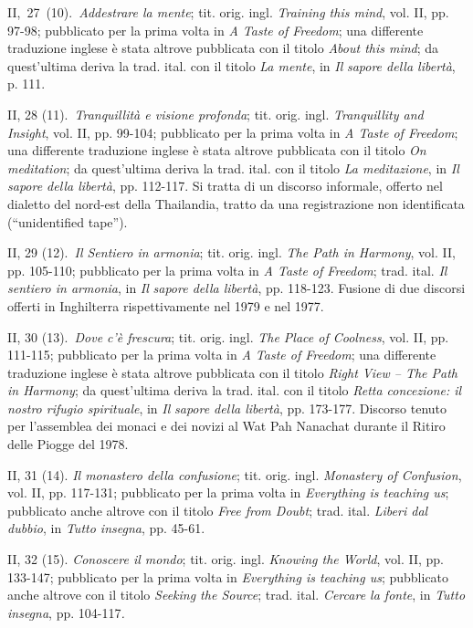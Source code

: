 II,~27~(10).~\emph{Addestrare la mente}; tit. orig. ingl. \emph{Training
this mind}, vol. II, pp. 97-98; pubblicato per la prima volta in \emph{A
Taste of Freedom}; una differente traduzione inglese è stata altrove
pubblicata con il titolo \emph{About this mind}; da quest'ultima deriva
la trad. ital. con il titolo \emph{La mente}, in \emph{Il} \emph{sapore
della libertà}, p. 111.

II, 28 (11).~\emph{Tranquillità e visione profonda}; tit. orig. ingl.
\emph{Tranquillity and Insight}, vol. II, pp. 99-104; pubblicato per la
prima volta in \emph{A Taste of Freedom}; una differente traduzione
inglese è stata altrove pubblicata con il titolo \emph{On meditation};
da quest'ultima deriva la trad. ital. con il titolo \emph{La
meditazione}, in \emph{Il} \emph{sapore della libertà}, pp. 112-117. Si
tratta di un discorso informale, offerto nel dialetto del nord-est della
Thailandia, tratto da una registrazione non identificata (``unidentified
tape'').

II, 29 (12).~\emph{Il Sentiero in armonia}; tit. orig. ingl. \emph{The
Path in Harmony}, vol. II, pp. 105-110; pubblicato per la prima volta in
\emph{A Taste of Freedom}; trad. ital. \emph{Il sentiero in armonia}, in
\emph{Il} \emph{sapore della libertà}, pp. 118-123. Fusione di due
discorsi offerti in Inghilterra rispettivamente nel 1979 e nel 1977.

II, 30 (13).~\emph{Dove c'è frescura}; tit. orig. ingl. \emph{The Place
of Coolness}, vol. II, pp. 111-115; pubblicato per la prima volta in
\emph{A Taste of Freedom}; una differente traduzione inglese è stata
altrove pubblicata con il titolo \emph{Right View -- The Path in
Harmony}; da quest'ultima deriva la trad. ital. con il titolo
\emph{Retta concezione: il nostro rifugio spirituale}, in \emph{Il}
\emph{sapore della libertà}, pp. 173-177. Discorso tenuto per
l'assemblea dei monaci e dei novizi al Wat Pah Nanachat durante il
Ritiro delle Piogge del 1978.

II, 31 (14). \emph{Il monastero della confusione}; tit. orig. ingl.
\emph{Monastery of Confusion}, vol. II, pp. 117-131; pubblicato per la
prima volta in \emph{Everything is teaching us}; pubblicato anche
altrove con il titolo \emph{Free from Doubt}; trad. ital. \emph{Liberi
dal dubbio}, in \emph{Tutto insegna}, pp. 45-61.

II, 32 (15). \emph{Conoscere il mondo}; tit. orig. ingl. \emph{Knowing
the World}, vol. II, pp. 133-147; pubblicato per la prima volta in
\emph{Everything is teaching us}; pubblicato anche altrove con il titolo
\emph{Seeking the Source}; trad. ital. \emph{Cercare la fonte}, in
\emph{Tutto insegna}, pp. 104-117\emph{.}

